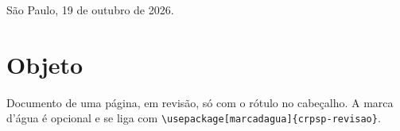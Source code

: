 \documentclass{crpsp-timbrado}
\begin{document}
\noindent São Paulo, 19 de outubro de 2026.

\section{Objeto}

Documento de uma página, em revisão, só com o rótulo no cabeçalho. A marca
d'água é opcional e se liga com \texttt{\textbackslash usepackage[marcadagua]\{crpsp-revisao\}}.
\end{document}
